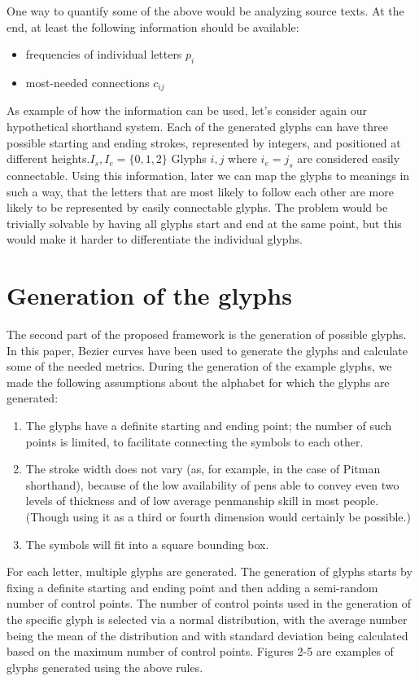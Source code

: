 \documentclass[conference]{IEEEtran}
\begin{document}
One way to quantify some of the above would be analyzing source texts. At the end, at least the following information should be available:
\begin{itemize}
        \item frequencies of individual letters \(p_i\)
        \item most-needed connections \(c_{ij}\)
\end{itemize}

As example of how the information can be used, let's consider again our hypothetical shorthand system. Each of the generated glyphs can have three possible starting and ending strokes, represented by integers, and positioned at different heights.\(I_s, I_e=\{0, 1, 2\}\) Glyphs \(i, j\) where \(i_e=j_s\) are considered easily connectable. Using this information, later we can map the glyphs to meanings in such a way, that the letters that are most likely to follow each other are more likely to be
represented by easily connectable glyphs. The problem would be trivially solvable by having all glyphs start and end at the same point, but this would make it harder to differentiate the individual glyphs.

\section{Generation of the glyphs}
The second part of the proposed framework is the generation of possible glyphs. In this paper, Bezier curves have been used to generate the glyphs and calculate some of the needed metrics.
During the generation of the example glyphs, we made the following assumptions about the alphabet for which the glyphs are generated:
\begin{enumerate}
        \item The glyphs have a definite starting and ending point; the number of such points is limited, to facilitate connecting the symbols to each other.
        \item The stroke width does not vary (as, for example, in the case of Pitman shorthand), because of the low availability of pens able to convey even two levels of thickness and of low average penmanship skill in most people. (Though using it as a third or fourth dimension would certainly be possible.)
        \item The symbols will fit into a square bounding box.
\end{enumerate}
For each letter, multiple glyphs are generated. The generation of glyphs starts by fixing a definite starting and ending point and then adding a semi-random number of control points. The number of control points used in the generation of the specific glyph is selected via a normal distribution, with the average number being the mean of the distribution and with standard deviation being calculated based on the maximum number of control points. Figures 2-5 are examples of glyphs generated using the above rules.
\end{document}
